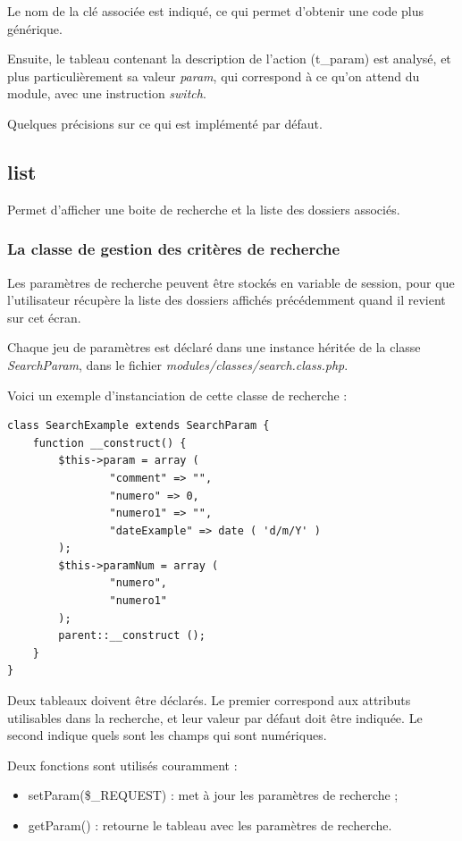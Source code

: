 {Le nom de la clé associée est indiqué, ce qui permet d'obtenir une code plus générique.

Ensuite, le tableau contenant la description de l'action (t\_param) est analysé, et plus particulièrement sa valeur \textit{param}, qui correspond à ce qu'on attend du module, avec une instruction \textit{switch}.

Quelques précisions sur ce qui est implémenté par défaut.

\subsection{list}

Permet d'afficher une boite de recherche et la liste des dossiers associés. 

\subsubsection{La classe de gestion des critères de recherche}

Les paramètres de recherche peuvent être stockés en variable de session, pour que l'utilisateur récupère la liste des dossiers affichés précédemment quand il revient sur cet écran. 

Chaque jeu de paramètres est déclaré dans une instance héritée de la classe \textit{SearchParam}, dans le fichier \textit{modules/classes/search.class.php}.

Voici un exemple d'instanciation de cette classe de recherche :
\begin{lstlisting}
class SearchExample extends SearchParam {
	function __construct() {
		$this->param = array (
				"comment" => "",
				"numero" => 0,
				"numero1" => "",
				"dateExample" => date ( 'd/m/Y' ) 
		);
		$this->paramNum = array (
				"numero",
				"numero1" 
		);
		parent::__construct ();
	}
}
\end{lstlisting}

Deux tableaux doivent être déclarés. Le premier correspond aux attributs utilisables dans la recherche, et leur valeur par défaut doit être indiquée. Le second indique quels sont les champs qui sont numériques.

Deux fonctions sont utilisés couramment : 
\begin{itemize}
\item setParam(\$\_REQUEST) : met à jour les paramètres de recherche ;
\item getParam() : retourne le tableau avec les paramètres de recherche.
\end{itemize}

}
